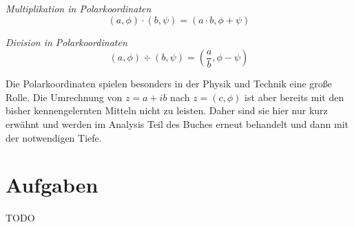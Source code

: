 \begin{definition} \textsl{Multiplikation in Polarkoordinaten}
\[
(a,\phi) \cdot (b,\psi) = (a\cdot b, \phi+\psi)
\]
\end{definition}

\begin{definition} \textsl{Division in Polarkoordinaten}
\[
(a,\phi) \div (b,\psi) = \left(\frac{a}{b}, \phi-\psi\right)
\]
\end{definition}

Die Polarkoordinaten spielen besonders in der Physik und Technik eine große Rolle. Die Umrechnung von $z=a+ib$ nach $z=(c,\phi)$ ist aber bereits mit den bisher kennengelernten Mitteln nicht zu leisten. Daher sind sie hier nur kurz erwähnt und werden im Analysis Teil des Buches erneut behandelt und dann mit der notwendigen Tiefe. 


\section{Aufgaben}
TODO

